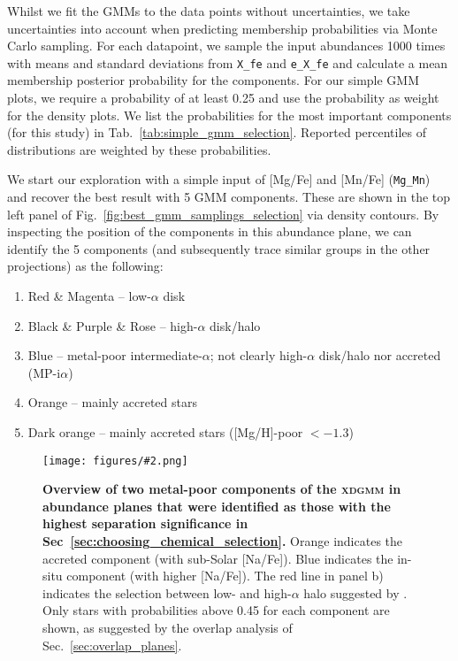 \documentclass[fleqn,usenatbib]{mnras}
\newcommand{\codeicon}{{\faCloudDownload}}
\newcommand{\codelink}[1]{\href{https://github.com/svenbuder/Accreted-stars-in-GALAH-DR3/tree/main/figures/#1.ipynb}{\codeicon}\,\,}
\newcommand{\oscaption}[2]{\caption{#2 \codelink{#1}}}
\newcommand{\figuretextwidth}[4]{\begin{figure*} \centering \texttt{[image: figures/\#2.png]}\oscaption{#3}{#4}\label{fig:#2} \end{figure*}}
\begin{document}
Whilst we fit the GMMs to the data points without uncertainties, we take uncertainties into account when predicting membership probabilities via Monte Carlo sampling. For each datapoint, we sample the input abundances 1000 times with means and standard deviations from \texttt{X\_fe} and \texttt{e\_X\_fe} and calculate a mean membership posterior probability for the components. For our simple GMM plots, we require a probability of at least 0.25 and use the probability as weight for the density plots. We list the probabilities for the most important components (for this study) in Tab.~\ref{tab:simple_gmm_selection}. Reported percentiles of distributions are weighted by these probabilities.

We start our exploration with a simple input of [Mg/Fe] and [Mn/Fe] (\texttt{Mg\_Mn}) and recover the best result with 5 GMM components. These are shown in the top left panel of Fig.~\ref{fig:best_gmm_samplings_selection} via density contours. By inspecting the position of the components in this abundance plane, we can identify the 5 components (and subsequently trace similar groups in the other projections) as the following:
\begin{enumerate}
\item Red \& Magenta -- low-$\alpha$ disk
\item Black \& Purple \& Rose -- high-$\alpha$ disk/halo
\item Blue -- metal-poor intermediate-$\alpha$; not clearly high-$\alpha$ disk/halo nor accreted (MP-i$\alpha$)
\item Orange -- mainly accreted stars
 \item Dark orange -- mainly accreted stars ([Mg/H]-poor $< -1.3$)
\end{enumerate}

\figuretextwidth{17cm}{nafe_mgmn_overview}{chronochemodynamic_comparison}{
\textbf{Overview of two metal-poor components of the \textsc{xdgmm} in abundance planes that were identified as those with the highest separation significance in Sec~\ref{sec:choosing_chemical_selection}.}
Orange indicates the accreted component (with sub-Solar [Na/Fe]).
Blue indicates the in-situ component (with higher [Na/Fe]).
The red line in panel b) indicates the selection between low- and high-$\alpha$ halo suggested by \citet{Nissen2010}.
Only stars with probabilities above 0.45 for each component are shown, as suggested by the overlap analysis of Sec.~\ref{sec:overlap_planes}.
}
\end{document}
